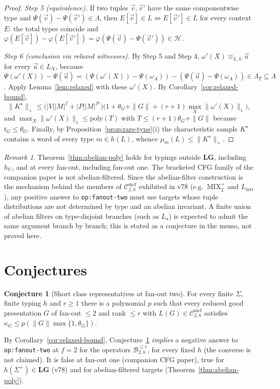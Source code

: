 \documentclass[11pt]{article}
\theoremstyle{definition}
\newtheorem{conjecture}[theorem]{Conjecture}
\theoremstyle{remark}
\newtheorem{remark}[theorem]{Remark}
\newcommand{\Cmcf}[2]{\mathcal{C}^{\mathrm{mcf}}_{#1,#2}}
\newcommand{\tuple}[1]{\vec{#1}}
\newcommand{\B}{\mathcal B}
\begin{document}
\begin{proof}
\emph{Step 5 (equivalence).}  If two tuples $\tuple v,\tuple v'$ have the
same componentwise type and $\Psi(\tuple v)-\Psi(\tuple v')\in\Lambda$,
then $E[\tuple v]\in L\iff E[\tuple v']\in L$ for every context $E$: the
total types coincide and
$\varphi(E[\tuple v])-\varphi(E[\tuple v'])=
\bar\varphi(\Psi(\tuple v)-\Psi(\tuple v'))\in\mathcal H$.

\emph{Step 6 (conclusion via relaxed witnesses).}  By Step 5 and
Step 4, $\omega'(X)\equiv_{L,h}\tuple u$ for every $\tuple u\in L_X$,
because $\Psi(\omega'(X))-\Psi(\tuple u)=(\Psi(\omega'(X))-\Psi(\omega_A))-
(\Psi(\tuple u)-\Psi(\omega_A))\in\Lambda_T\subseteq\Lambda$.  Apply
Lemma~\ref{lem:relaxed} with these $\omega'(X)$.  By
Corollary~\ref{cor:relaxed-bound},
\[
 \|K^\star\|_+\le
 \bigl(|V||M|^f+|P||M|^{fr}\bigr)
 \bigl(1+\theta_G+\|G\|+(r+1)\max_X\|\omega'(X)\|_1\bigr),
\]
and $\max_X\|\omega'(X)\|_1\le\mathrm{poly}(T)$ with
$T\le(r+1)\theta_G+\|G\|$ because $t_G\le\theta_G$.  Finally, by
Proposition~\ref{prop:rare-type}(i) the characteristic sample $K^\star$
contains a word of every type $m\in h(L)$, whence
$\mu_m(L)\le\|K^\star\|_+$.
\end{proof}

\begin{remark}
Theorem~\ref{thm:abelian-poly} holds for typings outside $\mathbf{LG}$,
including $h_{\mathrm U}$, and at every fan-out, including fan-out one.
The bracketed CFG family of the companion paper is not abelian-filtered.
Since the abelian-filter construction is the mechanism behind the members
of $\Cmcf{f}{h}$ exhibited in v78 (e.g.\ $\mathrm{MIX}_2^+$ and
$L_{\mathrm{intr}}$), any positive answer to \texttt{op:fanout-two} must use
targets whose tuple distributions are not determined by type and an
abelian invariant.  A finite union of abelian filters on type-disjoint
branches (such as $L_\star$) is expected to admit the same argument branch
by branch; this is stated as a conjecture in the memo, not proved here.
\end{remark}

\section{Conjectures}
\begin{conjecture}[Short class representatives at fan-out two]
\label{conj:kappa}
For every finite $\Sigma$, finite typing $h$ and $r\ge1$ there is a
polynomial $p$ such that every reduced good presentation $G$ of fan-out
$\le2$ and rank $\le r$ with $L(G)\in\Cmcf{2}{h}$ satisfies
$\kappa_G\le p(\|G\|\max\{1,\theta_G\})$.
\end{conjecture}
By Corollary~\ref{cor:relaxed-bound}, Conjecture~\ref{conj:kappa}
\emph{implies} a negative answer to \texttt{op:fanout-two} at $f=2$ for the
operators $\B^{\le r}_{2,h}$, for every fixed $h$ (the converse is not
claimed).  It is false at fan-out one (companion CFG paper), true
for $h(\Sigma^+)\in\mathbf{LG}$ (v78) and for abelian-filtered targets
(Theorem~\ref{thm:abelian-poly}).
\end{document}
